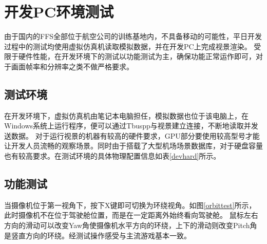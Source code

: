 \section{开发PC环境测试}
由于国内的FFS全部位于航空公司的训练基地内，不具备移动的可能性，平日开发过程中的测试均使用虚拟仿真机读取模拟数据，并在开发PC上完成视景渲染。
受限于硬件性能，在开发环境下的测试以功能测试为主，确保功能正常运作即可，对于画面帧率和分辨率之类不做严格要求。
\subsection{测试环境}
在开发环境下，虚拟仿真机由笔记本电脑担任，模拟数据也位于该电脑上，在Windows系统上运行程序，便可以通过Tbuspp与视景建立连接，不断地读取并发送数据。
对于运行视景的机器有较高的硬件要求，GPU部分要使用较高型号才能让开发人员流畅的观察场景。同时由于搭载了大型机场场景数据库，对于硬盘容量也有较高要求。在测试环境的具体物理配置信息如表\ref{devhard}所示。

\subsection{功能测试}
\par
当摄像机位于第一视角下，按下X键即可切换为环绕视角。如图\ref{orbittest}所示，此时摄像机不在位于驾驶舱位置，而是在一定距离外始终看向驾驶舱。
鼠标左右方向的滑动可以改变Yaw角使摄像机水平方向的环绕，上下的滑动则改变Pitch角是竖直方向的环绕。经测试操作感受与主流游戏基本一致。


